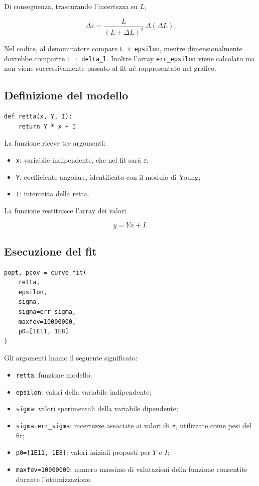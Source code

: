 \documentclass[11pt,a4paper]{book}
\begin{document}
Di conseguenza, trascurando l'incertezza su $L$,

\begin{equation}
    \Delta\varepsilon=
    \frac{L}{(L+\Delta L)^2}\,\Delta(\Delta L).
\end{equation}

Nel codice, al denominatore compare \texttt{L + epsilon}, mentre dimensionalmente dovrebbe comparire \texttt{L + delta\_l}. Inoltre l'array \texttt{err\_epsilon} viene calcolato ma non viene successivamente passato al fit né rappresentato nel grafico.

\subsection{Definizione del modello}

\begin{lstlisting}
def retta(x, Y, I):
    return Y * x + I
\end{lstlisting}

La funzione riceve tre argomenti:

\begin{itemize}
    \item \texttt{x}: variabile indipendente, che nel fit sarà $\varepsilon$;
    \item \texttt{Y}: coefficiente angolare, identificato con il modulo di Young;
    \item \texttt{I}: intercetta della retta.
\end{itemize}

La funzione restituisce l'array dei valori

\begin{equation}
    y=Yx+I.
\end{equation}

\subsection{Esecuzione del fit}

\begin{lstlisting}
popt, pcov = curve_fit(
    retta,
    epsilon,
    sigma,
    sigma=err_sigma,
    maxfev=10000000,
    p0=[1E11, 1E8]
)
\end{lstlisting}

Gli argomenti hanno il seguente significato:

\begin{itemize}
    \item \texttt{retta}: funzione modello;
    \item \texttt{epsilon}: valori della variabile indipendente;
    \item \texttt{sigma}: valori sperimentali della variabile dipendente;
    \item \texttt{sigma=err\_sigma}: incertezze associate ai valori di $\sigma$, utilizzate come pesi del fit;
    \item \texttt{p0=[1E11, 1E8]}: valori iniziali proposti per $Y$ e $I$;
    \item \texttt{maxfev=10000000}: numero massimo di valutazioni della funzione consentite durante l'ottimizzazione.
\end{itemize}
\end{document}
